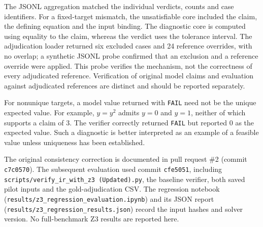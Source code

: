 The JSONL aggregation matched the individual verdicts, counts and case identifiers. For a fixed-target mismatch, the unsatisfiable core included the claim, the defining equation and the input binding. The diagnostic core is computed using equality to the claim, whereas the verdict uses the tolerance interval. The adjudication loader returned six excluded cases and 24 reference overrides, with no overlap; a synthetic JSONL probe confirmed that an exclusion and a reference override were applied. This probe verifies the mechanism, not the correctness of every adjudicated reference. Verification of original model claims and evaluation against adjudicated references are distinct and should be reported separately.

For nonunique targets, a model value returned with \texttt{FAIL} need not be the unique expected value. For example, $y=y^2$ admits $y=0$ and $y=1$, neither of which supports a claim of 3. The verifier correctly returned \texttt{FAIL} but reported 0 as the expected value. Such a diagnostic is better interpreted as an example of a feasible value unless uniqueness has been established.

The original consistency correction is documented in pull request \#2 (commit \texttt{c7c0570}). The subsequent evaluation used commit \texttt{cfe5051}, including \texttt{scripts/\allowbreak verify\_ir\_with\_z3 (Updated).py}, the baseline verifier, both saved pilot inputs and the gold-adjudication CSV. The regression notebook (\texttt{results/\allowbreak z3\_regression\_evaluation.ipynb}) and its JSON report (\texttt{results/\allowbreak z3\_regression\_results.json}) record the input hashes and solver version. No full-benchmark Z3 results are reported here.
\par\endgroup
